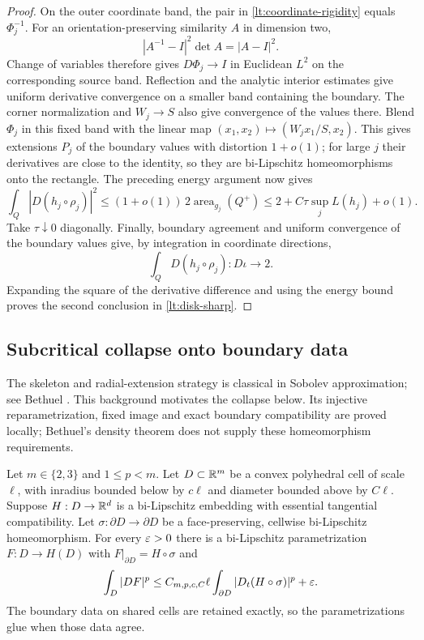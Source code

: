 \begin{proof}
On the outer coordinate band, the pair in
\eqref{lt:coordinate-rigidity} equals $\Phi_j^{-1}$.  For an
orientation-preserving similarity $A$ in dimension two,
\[
 |A^{-1}-I|^2\det A=|A-I|^2.
\]
Change of variables therefore gives $D\Phi_j\to I$ in Euclidean
$L^2$ on the corresponding source band.  Reflection and the analytic
interior estimates give uniform derivative convergence on a smaller
band containing the boundary.  The corner normalization and $W_j\to S$
also give convergence of the values there.  Blend $\Phi_j$ in this
fixed band with the linear map
$(x_1,x_2)\mapsto(W_jx_1/S,x_2)$.  This gives extensions $P_j$ of the
boundary values with distortion $1+o(1)$; for large $j$ their derivatives
are close to the identity, so they are bi-Lipschitz homeomorphisms onto
the rectangle.  The preceding energy argument now gives
\[
 \int_Q|D(h_j\circ\rho_j)|^2
   \leq(1+o(1))\,2\operatorname{area}_{g_j}(Q^+)
   \leq2+C\tau\sup_jL(h_j)+o(1).
\]
Take $\tau\downarrow0$ diagonally.  Finally, boundary agreement and
uniform convergence of the boundary values give, by integration in
coordinate directions,
\[
 \int_Q D(h_j\circ\rho_j):D\iota\longrightarrow2.
\]
Expanding the square of the derivative difference and using the energy
bound proves the second conclusion in \eqref{lt:disk-sharp}.
\end{proof}

\subsection{Subcritical collapse onto boundary data}

The skeleton and radial-extension strategy is classical in Sobolev
approximation; see Bethuel \cite[Section~II.1, pp.~164--165, and
Section~II.3, Eqs.~(32), (37), pp.~170--171]{Bethuel1991}.
This background motivates the collapse below.  Its injective
reparametrization, fixed image and exact boundary compatibility are
proved locally; Bethuel's density theorem does not supply these
homeomorphism requirements.

\begin{lemma}
\label{lt:collapse}
Let $m\in\{2,3\}$ and $1\leq p<m$.  Let $D\subset\mathbb R^m$ be a
convex polyhedral cell of scale $\ell$, with inradius bounded below by
$c\ell$ and diameter bounded above by $C\ell$.  Suppose
$H:D\to\mathbb R^d$ is a bi-Lipschitz embedding with essential tangential
compatibility.  Let $\sigma:\partial D\to\partial D$ be a
face-preserving, cellwise bi-Lipschitz homeomorphism.  For every
$\varepsilon>0$ there is a bi-Lipschitz parametrization $F:D\to H(D)$ with
$F|_{\partial D}=H\circ\sigma$ and
\begin{equation}
 \int_D|DF|^p
       \leq C_{m,p,c,C}\ell
                    \int_{\partial D}|D_t(H\circ\sigma)|^p+\varepsilon.
 \label{lt:collapse-estimate}
\end{equation}
The boundary data on shared cells are retained exactly, so the
parametrizations glue when those data agree.
\end{lemma}

